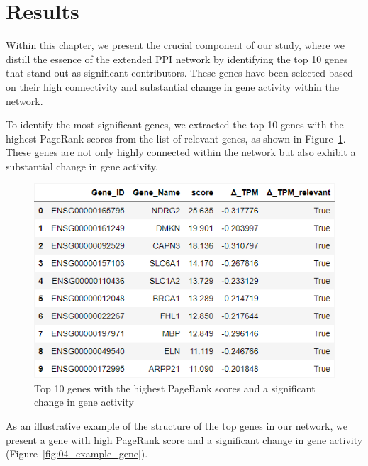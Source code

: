 \section{Results} \label{sec:results}

Within this chapter, we present the crucial component of our study,
where we distill the essence of the extended PPI network by identifying the top 10 genes that stand out as significant contributors.
These genes have been selected based on their high connectivity and substantial change in gene activity within the network.


To identify the most significant genes, we extracted the top 10 genes with the highest PageRank scores from the list of relevant genes,
as shown in Figure~\ref{fig:03_03_df_pagerank_relevant}.
These genes are not only highly connected within the network but also exhibit a substantial change in gene activity.

\begin{figure}[h]
    \centering
    \includegraphics[height=\dfheightdouble]{figures/03_03_df_pagerank_relevant}
    \caption{Top 10 genes with the highest PageRank scores and a significant change in gene activity}
    \label{fig:03_03_df_pagerank_relevant}
\end{figure}

As an illustrative example of the structure of the top genes in our network,
we present a gene with high PageRank score and a significant change in gene activity
(Figure~\ref{fig:04_example_gene}).

